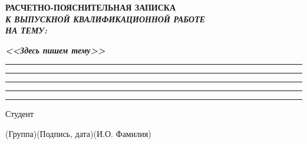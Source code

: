 \documentclass[14pt, russian]{scrartcl}
\begin{document}
\sloppy
\setcounter{secnumdepth}{2}

\def\figurename{Рисунок}

\begin{titlepage}
\thispagestyle{empty}
\newpage

\bmstuheader
 
 
\vspace{3em}
 
\begin{center}
\Large \bf{РАСЧЕТНО-ПОЯСНИТЕЛЬНАЯ ЗАПИСКА\\\textbf{\textit{К ВЫПУСКНОЙ КВАЛИФИКАЦИОННОЙ РАБОТЕ\\НА ТЕМУ:}} \\}
\end{center}

\vspace*{-6ex} 
\begin{center}
\Large{\textit{\textbf{<<Здесь пишем тему>>}}}

\vspace*{-3ex}
\rule{1\textwidth}{1.2pt}

\vspace*{-0.2ex}
\rule{1\textwidth}{1.2pt}

\vspace*{-0.2ex}
\rule{1\textwidth}{1.2pt}

\vspace*{-0.2ex}
\rule{1\textwidth}{1.2pt}

\vspace*{-0.2ex}
\rule{1\textwidth}{1.2pt}
\end{center}
 
\vspace{\fill}
 

\newlength{\ML}

\noindent Студент \underline{\hspace{1.5cm}} \hfill \underline{\hspace{4cm}}\quad
\underline{\hspace{4cm}}

\vspace{-2.1ex}
\noindent\hspace{9ex}\scriptsize{(Группа)}\normalsize\hspace{170pt}\hspace{2ex}\scriptsize{(Подпись, дата)}\normalsize\hspace{30pt}\hspace{6ex}\scriptsize{(И.О. Фамилия)}\normalsize


\end{titlepage}
\end{document}
